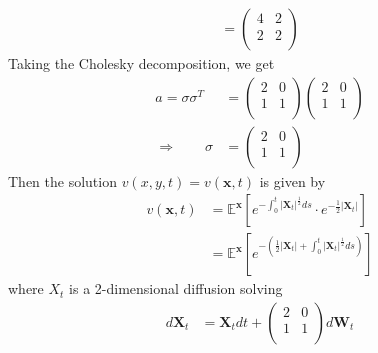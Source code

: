 \documentclass[12pt]{article}
\theoremstyle{plain}
\theoremstyle{definition}
\theoremstyle{remark}
\begin{document}
\begin{enumerate}
\begin{align*}
      =
      \begin{pmatrix}
        4 & 2 \\
        2 & 2 \\
      \end{pmatrix}
    \end{align*}
    Taking the Cholesky decomposition, we get
    \begin{align*}
      a = \sigma \sigma^T &=
      \begin{pmatrix}
        2 & 0 \\
        1 & 1 \\
      \end{pmatrix}
      \begin{pmatrix}
        2 & 0 \\
        1 & 1 \\
      \end{pmatrix}
      \\
      \Rightarrow \qquad
      \sigma &=
      \begin{pmatrix}
        2 & 0 \\
        1 & 1 \\
      \end{pmatrix}
    \end{align*}
    Then the solution $v(x,y,t) = v(\mathbf{x},t)$ is given by
    \begin{align*}
      v(\mathbf{x},t)
      &= \mathbb{E}^\mathbf{x}
      \left[
        e^{-\int^t_0 |\mathbf{X}_t|^{\frac{1}{2}} ds}
        \cdot e^{-\frac{1}{2}|\mathbf{X}_t|}
      \right]\\
      &= \mathbb{E}^\mathbf{x}
      \left[
        e^{-\left(\frac{1}{2}|\mathbf{X}_t|+\int^t_0 |\mathbf{X}_t|^{\frac{1}{2}} ds\right)}
      \right]
    \end{align*}
    where $X_t$ is a 2-dimensional diffusion solving
    \begin{align*}
      d\mathbf{X}_t
      &=
      \mathbf{X}_t dt
      + \begin{pmatrix}
          2 & 0 \\
          1 & 1 \\
        \end{pmatrix} d\mathbf{W}_t
    \end{align*}



\end{enumerate}
\end{document}
